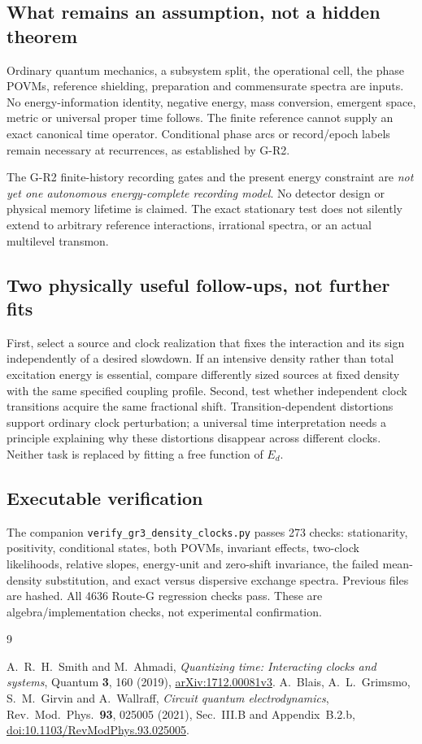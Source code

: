 \documentclass[11pt,a4paper]{article}
\begin{document}
\subsection*{What remains an assumption, not a hidden theorem}
Ordinary quantum mechanics, a subsystem split, the operational cell,
the phase POVMs, reference shielding, preparation and commensurate
spectra are inputs. No energy-information identity, negative energy,
mass conversion, emergent space, metric or universal proper time follows.
The finite reference cannot supply an exact canonical time operator.
Conditional phase arcs or record/epoch labels remain necessary at
recurrences, as established by G-R2.

The G-R2 finite-history recording gates and the present energy constraint
are \emph{not yet one autonomous energy-complete recording model}.
No detector design or physical memory lifetime is claimed. The exact
stationary test does not silently extend to arbitrary reference
interactions, irrational spectra, or an actual multilevel transmon.

\subsection*{Two physically useful follow-ups, not further fits}
First, select a source and clock realization that fixes the interaction
and its sign independently of a desired slowdown. If an intensive density
rather than total excitation energy is essential, compare differently
sized sources at fixed density with the same specified coupling profile.
Second, test whether independent clock transitions acquire the same
fractional shift. Transition-dependent distortions support ordinary
clock perturbation; a universal time interpretation needs a principle
explaining why these distortions disappear across different clocks.
Neither task is replaced by fitting a free function of $E_d$.

\subsection*{Executable verification}
The companion \texttt{verify\_gr3\_density\_clocks.py} passes 273 checks:
stationarity, positivity, conditional states, both POVMs, invariant
effects, two-clock likelihoods, relative slopes, energy-unit and
zero-shift invariance, the failed mean-density substitution, and
exact versus dispersive exchange spectra. Previous files are hashed.
All 4636 Route-G regression checks pass. These are algebra/implementation
checks, not experimental confirmation.

\begin{thebibliography}{9}
\raggedright
{}
A.~R.~H.~Smith and M.~Ahmadi, \emph{Quantizing time: Interacting clocks
and systems}, Quantum \textbf{3}, 160 (2019),
\href{https://arxiv.org/abs/1712.00081v3}{arXiv:1712.00081v3}.
A.~Blais, A.~L.~Grimsmo, S.~M.~Girvin and A.~Wallraff,
\emph{Circuit quantum electrodynamics}, Rev.\ Mod.\ Phys.\
\textbf{93}, 025005 (2021), Sec.~III.B and Appendix~B.2.b,
\href{https://doi.org/10.1103/RevModPhys.93.025005}{doi:10.1103/RevModPhys.93.025005}.
\end{thebibliography}
\end{document}
